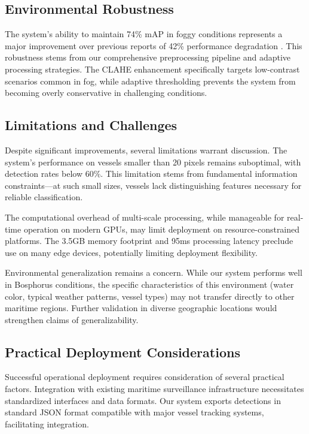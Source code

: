 \documentclass[10pt]{article}
\begin{document}
\subsection{Environmental Robustness}

The system's ability to maintain 74\% mAP in foggy conditions represents a major improvement over previous reports of 42\% performance degradation \cite{bovcon2017segmentation}. This robustness stems from our comprehensive preprocessing pipeline and adaptive processing strategies. The CLAHE enhancement specifically targets low-contrast scenarios common in fog, while adaptive thresholding prevents the system from becoming overly conservative in challenging conditions.

\subsection{Limitations and Challenges}

Despite significant improvements, several limitations warrant discussion. The system's performance on vessels smaller than 20 pixels remains suboptimal, with detection rates below 60\%. This limitation stems from fundamental information constraints—at such small sizes, vessels lack distinguishing features necessary for reliable classification.

The computational overhead of multi-scale processing, while manageable for real-time operation on modern GPUs, may limit deployment on resource-constrained platforms. The 3.5GB memory footprint and 95ms processing latency preclude use on many edge devices, potentially limiting deployment flexibility.

Environmental generalization remains a concern. While our system performs well in Bosphorus conditions, the specific characteristics of this environment (water color, typical weather patterns, vessel types) may not transfer directly to other maritime regions. Further validation in diverse geographic locations would strengthen claims of generalizability.

\subsection{Practical Deployment Considerations}

Successful operational deployment requires consideration of several practical factors. Integration with existing maritime surveillance infrastructure necessitates standardized interfaces and data formats. Our system exports detections in standard JSON format compatible with major vessel tracking systems, facilitating integration.
\end{document}
